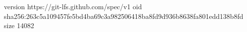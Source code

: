 version https://git-lfs.github.com/spec/v1
oid sha256:263c5a109457fe5bd4ba69c3a982506418ba8fd9d936b8638fa801edd138b8fd
size 14082
